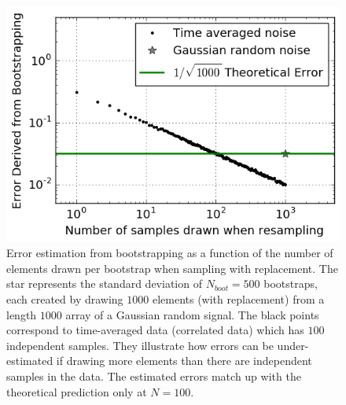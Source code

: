 \documentclass[preprint2,numberedappendix,tighten]{aastex6}  %
\begin{document}
\begin{figure}
	\centering
	\includegraphics[trim={0cm 0cm 0cm 0cm},width=\columnwidth]{plots/toy_error1.png}
	\caption{Error estimation from bootstrapping as a function of the number of elements drawn per bootstrap when 
sampling with replacement. The star represents the standard deviation of $N_{boot}=500$ bootstraps, each created by drawing $1000$ 
elements (with replacement) from a length $1000$ array of a Gaussian random signal. The black points correspond to time-averaged data (correlated data) which has $100$ independent samples. They illustrate how errors can be under-estimated if 
drawing more elements than there are independent samples in the data. The estimated errors match up with the theoretical 
prediction only at $N=100$.}
	\label{fig:toy_error1}
\end{figure}
\end{document}
